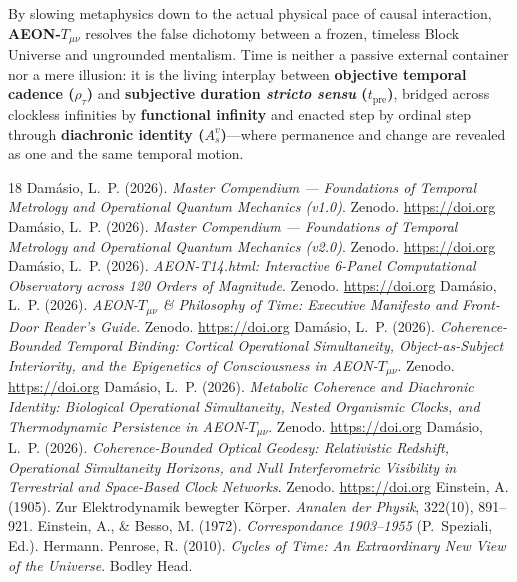 \documentclass[11pt,a4paper]{article}
\begin{document}
By slowing metaphysics down to the actual physical pace of causal interaction, \textbf{AEON-$T_{\mu\nu}$} resolves the false dichotomy between a frozen, timeless Block Universe and ungrounded mentalism. Time is neither a passive external container nor a mere illusion: it is the living interplay between \textbf{objective temporal cadence ($\rho_\tau$)} and \textbf{subjective duration \emph{stricto sensu} ($t_{\mathrm{pre}}$)}, bridged across clockless infinities by \textbf{functional infinity} and enacted step by ordinal step through \textbf{diachronic identity ($A_s^v$)}---where permanence and change are revealed as one and the same temporal motion.

\begin{thebibliography}{18}
 Dam\'asio, L.~P. (2026). \emph{Master Compendium --- Foundations of Temporal Metrology and Operational Quantum Mechanics (v1.0)}. Zenodo. \url{https://doi.org}
 Dam\'asio, L.~P. (2026). \emph{Master Compendium --- Foundations of Temporal Metrology and Operational Quantum Mechanics (v2.0)}. Zenodo. \url{https://doi.org}
 Dam\'asio, L.~P. (2026). \emph{AEON-T14.html: Interactive 6-Panel Computational Observatory across 120 Orders of Magnitude}. Zenodo. \url{https://doi.org}
 Dam\'asio, L.~P. (2026). \emph{AEON-$T_{\mu\nu}$ \& Philosophy of Time: Executive Manifesto and Front-Door Reader's Guide}. Zenodo. \url{https://doi.org}
 Dam\'asio, L.~P. (2026). \emph{Coherence-Bounded Temporal Binding: Cortical Operational Simultaneity, Object-as-Subject Interiority, and the Epigenetics of Consciousness in AEON-$T_{\mu\nu}$}. Zenodo. \url{https://doi.org}
 Dam\'asio, L.~P. (2026). \emph{Metabolic Coherence and Diachronic Identity: Biological Operational Simultaneity, Nested Organismic Clocks, and Thermodynamic Persistence in AEON-$T_{\mu\nu}$}. Zenodo. \url{https://doi.org}
 Dam\'asio, L.~P. (2026). \emph{Coherence-Bounded Optical Geodesy: Relativistic Redshift, Operational Simultaneity Horizons, and Null Interferometric Visibility in Terrestrial and Space-Based Clock Networks}. Zenodo. \url{https://doi.org}
 Einstein, A. (1905). Zur Elektrodynamik bewegter K\"orper. \emph{Annalen der Physik}, 322(10), 891--921.
 Einstein, A., \& Besso, M. (1972). \emph{Correspondance 1903--1955} (P.~Speziali, Ed.). Hermann.
 Penrose, R. (2010). \emph{Cycles of Time: An Extraordinary New View of the Universe}. Bodley Head.

\end{thebibliography}
\end{document}
